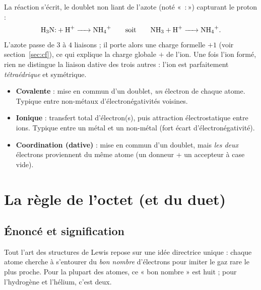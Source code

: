 \documentclass[11pt,a4paper]{article}
\begin{document}
\begin{exemple}
La réaction s'écrit, le doublet non liant de l'azote (noté « \,:\,») capturant le proton :
\[ \ce{H3N{:} + H+ -> NH4+}\qquad\text{soit}\qquad \ce{NH3 + H+ -> NH4+}. \]
L'azote passe de $3$ à $4$ liaisons ; il porte alors une charge formelle $+1$ (voir
section~\ref{sec:cf}), ce qui explique la charge globale $+$ de l'ion. Une fois l'ion formé, rien
ne distingue la liaison dative des trois autres : l'ion  est parfaitement
\emph{tétraédrique} et symétrique.
\end{exemple}

\begin{theoreme}
\begin{itemize}[leftmargin=1.6em,topsep=2pt,itemsep=3pt]
  \item \textbf{Covalente} : mise en commun d'un doublet, \emph{un} électron de chaque atome.
        Typique entre non-métaux d'électronégativités voisines.
  \item \textbf{Ionique} : transfert total d'électron(s), puis attraction électrostatique entre
        ions. Typique entre un métal et un non-métal (fort écart d'électronégativité).
  \item \textbf{Coordination (dative)} : mise en commun d'un doublet, mais \emph{les deux}
        électrons proviennent du même atome (un donneur + un accepteur à case vide).
\end{itemize}
\end{theoreme}

\section{La règle de l'octet (et du duet)}
\label{sec:octet}

\subsection{Énoncé et signification}

Tout l'art des structures de Lewis repose sur une idée directrice unique : chaque atome cherche
à s'entourer du \emph{bon nombre} d'électrons pour imiter le gaz rare le plus proche. Pour la
plupart des atomes, ce « bon nombre » est huit ; pour l'hydrogène et l'hélium, c'est deux.
\end{document}
